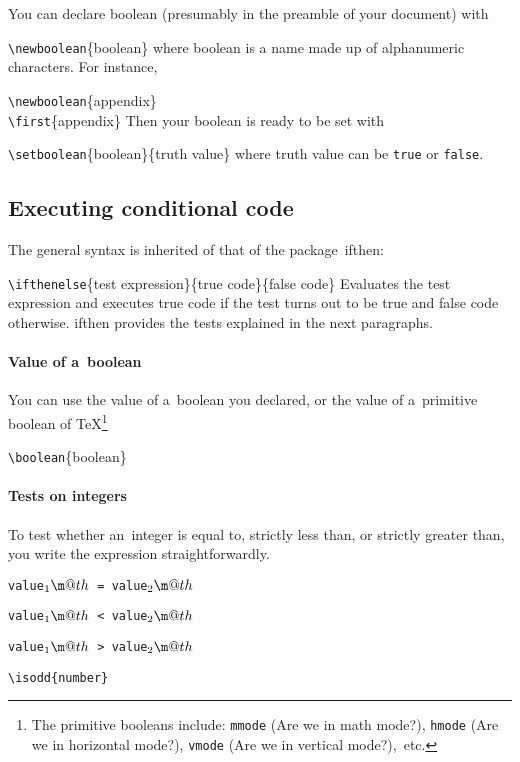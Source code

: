 \documentclass{article}
\makeatletter
\newcommand*{\cmd}[1]{\tex{\textbackslash #1}}
\newcommand*{\tex}{\texttt}
\newenvironment*{texcode}{\list{}{}\item\ttfamily}{\endlist}
\newcommand*{\marg}[1]{\{\meta{#1}\}}
\newcommand*{\meta}[1]{\textnormal{\textlangle#1\textrangle}}
\newcommand*{\1}{$_1\m@th$}
\newcommand*{\2}{$_2\m@th$}
\newcommand*{\pack}{\textsf}
\makeatother
\begin{document}
You can declare boolean (presumably in the preamble of your document) with
%
\begin{texcode}
\cmd{newboolean}\marg{boolean}
\end{texcode}
%
where \meta{boolean} is a name made up of alphanumeric characters.
For instance, 
%
\begin{texcode}
\cmd{newboolean}\{appendix\}\\
\cmd{first}\{appendix\}
\end{texcode}
%
Then your boolean is ready to be set with
%
\begin{texcode}
\cmd{setboolean}\marg{boolean}\marg{truth value}
\end{texcode}
%
where \meta{truth value} can be \tex{true} or \tex{false}.

\subsection{Executing conditional code}

The general syntax is inherited of that of the package~\pack{ifthen}:
%
\begin{texcode}
  \cmd{ifthenelse}\marg{test expression}\marg{true code}\marg{false code}
\end{texcode}
%
Evaluates the \meta{test expression} and executes \meta{true code} if the
test turns out to be true and \meta{false code} otherwise.  \pack{ifthen}
provides the tests explained in the next paragraphs.

\paragraph{Value of a~boolean}

You can use the value of a~boolean you declared, or the value of
a~primitive boolean of \TeX\footnote{The primitive booleans include:
  \tex{mmode} (Are we in math mode?), \tex{hmode} (Are we in
  horizontal mode?), \tex{vmode} (Are we in vertical mode?),~etc.}
%
\begin{texcode}
  \cmd{boolean}\marg{boolean}
\end{texcode}

\paragraph{Tests on integers}

To test whether an~integer is equal to, strictly less than, or
strictly greater than, you write the expression straightforwardly.
%
\begin{list}{}{}
\item \tex{\meta{value\1} = \meta{value\2}}
\item \tex{\meta{value\1} < \meta{value\2}}
\item \tex{\meta{value\1} > \meta{value\2}}
\item \tex{\textbackslash isodd\marg{number}}
\end{list}
\end{document}
